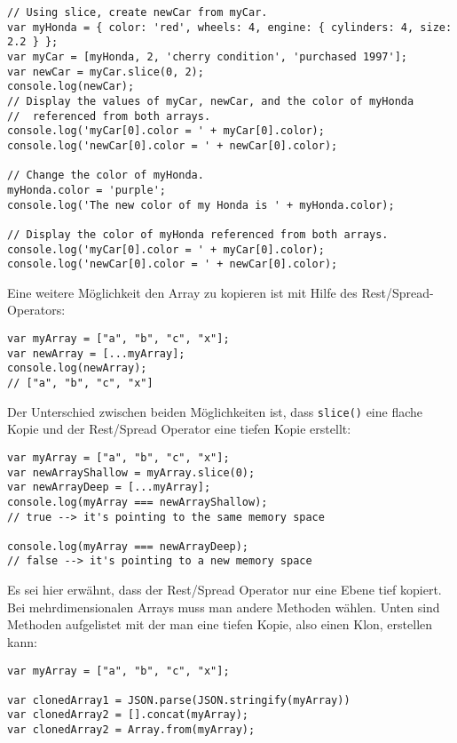 \documentclass[babel]{book}
\begin{document}
\begin{lstlisting}[caption=Array Konstruktor]
// Using slice, create newCar from myCar.
var myHonda = { color: 'red', wheels: 4, engine: { cylinders: 4, size: 2.2 } };
var myCar = [myHonda, 2, 'cherry condition', 'purchased 1997'];
var newCar = myCar.slice(0, 2);
console.log(newCar);
// Display the values of myCar, newCar, and the color of myHonda
//  referenced from both arrays.
console.log('myCar[0].color = ' + myCar[0].color);
console.log('newCar[0].color = ' + newCar[0].color);

// Change the color of myHonda.
myHonda.color = 'purple';
console.log('The new color of my Honda is ' + myHonda.color);

// Display the color of myHonda referenced from both arrays.
console.log('myCar[0].color = ' + myCar[0].color);
console.log('newCar[0].color = ' + newCar[0].color);
\end{lstlisting}

Eine weitere Möglichkeit den Array zu kopieren ist mit Hilfe des Rest/Spread-Operators:
\begin{lstlisting}[caption=Array Konstruktor]
var myArray = ["a", "b", "c", "x"];
var newArray = [...myArray];
console.log(newArray);
// ["a", "b", "c", "x"]
\end{lstlisting}

Der Unterschied zwischen beiden Möglichkeiten ist, dass \lstinline|slice()| eine flache Kopie und der Rest/Spread Operator eine tiefen Kopie erstellt:

\begin{lstlisting}[caption=Array Konstruktor]
var myArray = ["a", "b", "c", "x"];
var newArrayShallow = myArray.slice(0);
var newArrayDeep = [...myArray];
console.log(myArray === newArrayShallow);
// true --> it's pointing to the same memory space

console.log(myArray === newArrayDeep);
// false --> it's pointing to a new memory space
\end{lstlisting}

Es sei hier erwähnt, dass der Rest/Spread Operator nur eine Ebene tief kopiert. Bei mehrdimensionalen Arrays muss man andere Methoden wählen. Unten sind Methoden aufgelistet mit der man eine tiefen Kopie, also einen Klon, erstellen kann:

\begin{lstlisting}[caption=Array Konstruktor]
var myArray = ["a", "b", "c", "x"];

var clonedArray1 = JSON.parse(JSON.stringify(myArray))
var clonedArray2 = [].concat(myArray);
var clonedArray2 = Array.from(myArray);
\end{lstlisting}
\end{document}
